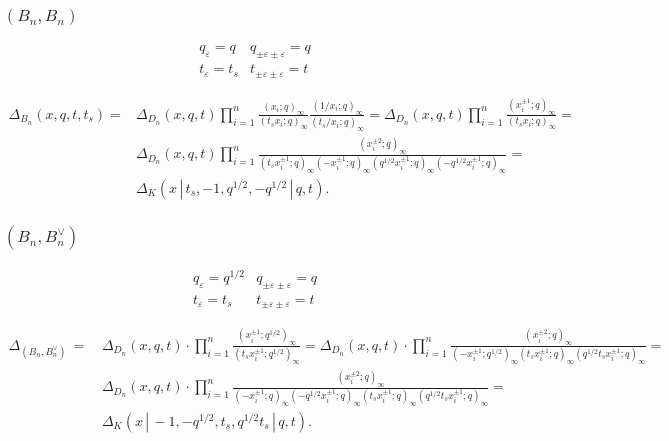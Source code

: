 \documentclass{article}
\def\nn{\nonumber}
\def\nn{\nonumber}
\def\ep{\varepsilon}
\begin{document}
\subsubsection*{$(B_n,B_n)$}
\begin{equation}
    \begin{array}{ll}
       q_{\ep} = q  &  q_{\pm \ep \pm \ep} = q  \\
        t_{\ep} = t_s &  t_{\pm \ep \pm \ep} =t
    \end{array}
\end{equation}

    \begin{align}
        \Delta_{B_n} (x,q,t,t_s) = & \Delta_{D_n}(x,q,t) \prod_{i=1}^{n}  \frac{\left( x_i;q\right)_{\infty}}{\left(t_s x_i ;q\right)_{\infty}}  \frac{\left( 1/x_i;q\right)_{\infty}}{\left(t_s/x_i ;q\right)_{\infty}} =  \Delta_{D_n}(x,q,t) \prod_{i=1}^{n}  \frac{\left( x_i^{\pm1};q\right)_{\infty}}{\left(t_s x_i ;q\right)_{\infty}} =\nn  \\ &
        \Delta_{D_n}(x,q,t) \prod_{i=1}^{n} \frac{\left( x_i^{\pm 2};q\right)_{\infty}}{\left( t_s x_i^{\pm1};q\right)_{\infty}\left( -x_i^{\pm1};q\right)_{\infty}\left( q^{1/2}x_i^{\pm1};q\right)_{\infty}\left( -q^{1/2} x_i^{\pm1};q\right)_{\infty}} = \nn \\
        & \boxed{\Delta_K (x\, | \, t_s, -1, q^{1/2}, -q^{1/2}\,| \,  q,t)}.
    \end{align}

\subsubsection*{$(B_n,B_n^{\vee})$}
\begin{equation}
    \begin{array}{ll}
       q_{\ep} = q^{1/2}  &  q_{\pm \ep \pm \ep} = q  \\
        t_{\ep} = t_s &  t_{\pm \ep \pm \ep} =t
    \end{array}
\end{equation}

\begin{align}
    \Delta_{(B_n,B_n^{\vee})}\, = \,& \Delta_{D_n}(x,q,t)\cdot \prod_{i=1}^{n} \frac{(x_i^{\pm1};q^{1/2})_{\infty}}{(t_s x_i^{\pm1};q^{1/2})_{\infty}} =\Delta_{D_n}(x,q,t)\cdot \prod_{i=1}^{n} \frac{(x_i^{\pm 2};q)_{\infty}}{(-x_i^{\pm1};q^{1/2})_{\infty}(t_s x_i^{\pm1};q)_{\infty}(q^{1/2}t_s x_i^{\pm1};q)_{\infty}} = \nn \\ &
    \Delta_{D_n}(x,q,t)\cdot \prod_{i=1}^{n} \frac{(x_i^{\pm 2};q)_{\infty}}{(-x_i^{\pm1};q)_{\infty}(-q^{1/2}x_i^{\pm1};q)_{\infty}(t_s x_i^{\pm1};q)_{\infty}(q^{1/2}t_s x_i^{\pm1};q)_{\infty}} = \nn \\
    & \boxed{\Delta_K(x \,|\,-1,-q^{1/2},t_s, q^{1/2}t_s\,|\, q,t)}.
\end{align}
\end{document}

